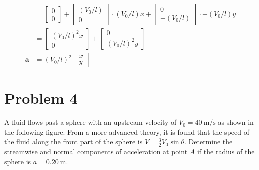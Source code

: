 \documentclass{article}
\begin{document}
\begin{align*}
    &= \begin{bmatrix}
        0
        \\
        0
       \end{bmatrix}
       +
       \begin{bmatrix}
        (V_0 / l)
        \\
        0
       \end{bmatrix} \cdot (V_0 / l) x
       +
       \begin{bmatrix}
        0
        \\
        -(V_0 / l)
       \end{bmatrix} \cdot -(V_0 / l)y
       \\
    &= \begin{bmatrix}
        (V_0 / l)^2 x
        \\
        0
       \end{bmatrix}
       +
       \begin{bmatrix}
        0
        \\
        (V_0 / l)^2 y
       \end{bmatrix}
       \\
    \mathbf{a} &= (V_0 / l)^2 \begin{bmatrix}
        x
        \\
        y
       \end{bmatrix}
\end{align*}

\newpage

\section*{Problem 4}
A fluid flows past a sphere with an upstream velocity of $V_0 = 40\ \textrm{m}/\textrm{s}$ as shown in the following figure. From a more advanced theory, it is found that the speed of the fluid along the front part of the sphere is $V = \frac{3}{2} V_0 \sin{\theta}$. Determine the streamwise and normal components of acceleration at point $A$ if the radius of the sphere is $a = 0.20\ \textrm{m}$.
\end{document}
